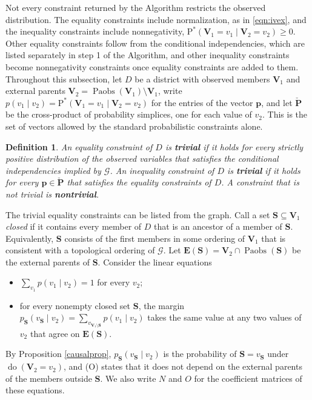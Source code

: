 \documentclass[12pt]{article}
\newtheorem{definition}{Definition}
\def\Pdo{{\mathrm{P}^*}}
\DeclareMathOperator{\Paobs}{Paobs}
\newcommand{\bV}{\boldsymbol{V}}
\newcommand{\bS}{\boldsymbol{S}}
\DeclareMathOperator{\Do}{do}
\begin{document}
Not every constraint returned by the Algorithm restricts the observed distribution. The equality constraints include normalization, as in \eqref{eqn:ivex}, and the inequality constraints include nonnegativity, $\Pdo(\bV_1 = v_1 \mid \bV_2 = v_2) \geq 0$. Other equality constraints follow from the conditional independencies, which are listed separately in step 1 of the Algorithm, and other inequality constraints become nonnegativity constraints once equality constraints are added to them. Throughout this subsection, let $D$ be a district with observed members $\bV_1$ and external parents $\bV_2 = \Paobs(\bV_1) \setminus \bV_1$, write $p(v_1 \mid v_2) = \Pdo(\bV_1 = v_1 \mid \bV_2 = v_2)$ for the entries of the vector $\boldsymbol{p}$, and let $\boldsymbol{\check{P}}$ be the cross-product of probability simplices, one for each value of $v_2$. This is the set of vectors allowed by the standard probabilistic constraints alone.

\begin{definition} \label{def:nontrivial}
An equality constraint of $D$ is \textbf{trivial} if it holds for every strictly positive distribution of the observed variables that satisfies the conditional independencies implied by $\mathcal{G}$. An inequality constraint of $D$ is \textbf{trivial} if it holds for every $\boldsymbol{p} \in \boldsymbol{\check{P}}$ that satisfies the equality constraints of $D$. A constraint that is not trivial is \textbf{nontrivial}.
\end{definition}

The trivial equality constraints can be listed from the graph. Call a set $\bS \subseteq \bV_1$ \emph{closed} if it contains every member of $D$ that is an ancestor of a member of $\bS$. Equivalently, $\bS$ consists of the first members in some ordering of $\bV_1$ that is consistent with a topological ordering of $\mathcal{G}$. Let $\boldsymbol{E}(\bS) = \bV_2 \cap \Paobs(\bS)$ be the external parents of $\bS$. Consider the linear equations
\begin{itemize}
\item[(N)] $\sum_{v_1} p(v_1 \mid v_2) = 1$ for every $v_2$;
\item[(O)] for every nonempty closed set $\bS$, the margin $p_{\bS}(v_{\bS} \mid v_2) = \sum_{v_{\bV_1 \setminus \bS}} p(v_1 \mid v_2)$ takes the same value at any two values of $v_2$ that agree on $\boldsymbol{E}(\bS)$.
\end{itemize}
By Proposition \ref{causalprop}, $p_{\bS}(v_{\bS} \mid v_2)$ is the probability of $\bS = v_{\bS}$ under $\Do(\bV_2 = v_2)$, and (O) states that it does not depend on the external parents of the members outside $\bS$. We also write $N$ and $O$ for the coefficient matrices of these equations.
\end{document}
